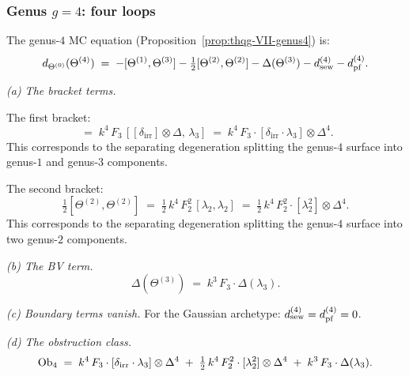 \subsubsection{Genus $g = 4$: four loops}

\begin{computation}
The genus-$4$ MC equation
(Proposition~\ref{prop:thqg-VII-genus4}) is:
\begin{equation}%
d_{\Theta^{(0)}}(\Theta^{(4)})
\;=\;
-[\Theta^{(1)},\Theta^{(3)}]
- \tfrac{1}{2}[\Theta^{(2)},\Theta^{(2)}]
- \Delta(\Theta^{(3)})
- \dsew^{(4)}
- \dpf^{(4)}.
\end{equation}

\medskip\noindent\emph{(a) The bracket terms.}

The first bracket:
\begin{equation}%
[\Theta^{(1)},\Theta^{(3)}]
\;=\;
k^4\, F_3\,
[[\delta_{\mathrm{irr}}] \otimes \Delta,\, \lambda_3]
\;=\;
k^4\, F_3 \cdot
[\delta_{\mathrm{irr}} \cdot \lambda_3]
\otimes \Delta^4.
\end{equation}
This corresponds to the separating degeneration splitting the
genus-$4$ surface into genus-$1$ and genus-$3$ components.

The second bracket:
\begin{equation}%
\tfrac{1}{2}[\Theta^{(2)},\Theta^{(2)}]
\;=\;
\tfrac{1}{2}\, k^4\, F_2^2\,
[\lambda_2,\lambda_2]
\;=\;
\tfrac{1}{2}\, k^4\, F_2^2 \cdot
[\lambda_2^2] \otimes \Delta^4.
\end{equation}
This corresponds to the separating degeneration splitting the
genus-$4$ surface into two genus-$2$ components.

\medskip\noindent\emph{(b) The BV term.}
\begin{equation}%
\Delta(\Theta^{(3)})
\;=\;
k^3\, F_3 \cdot \Delta(\lambda_3).
\end{equation}

\medskip\noindent\emph{(c) Boundary terms vanish.}
For the Gaussian archetype: $d_{\mathrm{sew}}^{(4)} = d_{\mathrm{pf}}^{(4)} = 0$.

\medskip\noindent\emph{(d) The obstruction class.}
\begin{equation}%
\Ob_4
\;=\;
k^4\, F_3 \cdot [\delta_{\mathrm{irr}} \cdot \lambda_3]
\otimes \Delta^4
\;+\;
\tfrac{1}{2}\, k^4\, F_2^2 \cdot [\lambda_2^2]
\otimes \Delta^4
\;+\;
k^3\, F_3 \cdot \Delta(\lambda_3).
\end{equation}


\end{computation}
